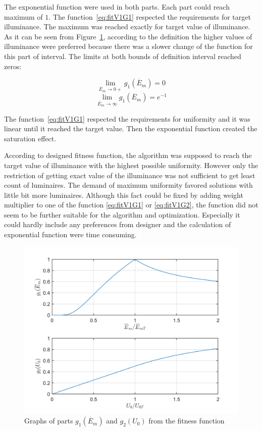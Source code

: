 The exponential function were used in both parts. Each part could reach maximum of $1$. The function~\ref{eq:fitV1G1} respected the requirements for target illuminance. The maximum was reached exactly for target value of illuminance. As it can be seen from Figure~\ref{fig:fitV1G1G2}, according to the definition the higher values of illuminance were preferred because there was a slower change of the function for this part of interval. The limits at both bounds of definition interval reached zeros:

\begin{equation}
\label{eq:g1lim0}
\lim_{\overline{E}_{m}\to 0+} g_1\left(\overline{E}_{m}\right) = 0
\end{equation}
\begin{equation}
\label{eq:g1limInf}
\lim_{\overline{E}_{m}\to \infty} g_1\left(\overline{E}_{m}\right) = e^{-1}
\end{equation}

The function~\ref{eq:fitV1G1} respected the requirements for uniformity and it was linear until it reached the target value. Then the exponential function created the saturation effect.

According to designed fitness function, the algorithm was supposed to reach the target value of illuminance with the highest possible uniformity. However only the restriction of getting exact value of the illuminance was not sufficient to get least count of luminaires. The demand of maximum uniformity favored solutions with little bit more luminaires. Although this fact could be fixed by adding weight multiplier to one of the function \ref{eq:fitV1G1} or \ref{eq:fitV1G2}, the function did not seem to be further suitable for the algorithm and optimization. Especially it could hardly include any preferences from designer and the calculation of exponential function were time consuming.

\begin{figure}[htb]
  \centering
  \includegraphics[width=\columnwidth]{obrG1G2}
  \caption{Graphs of parts $g_1\left(\overline{E}_{m}\right)$ and $g_2\left(U_0\right)$ from the fitness function}
  \label{fig:fitV1G1G2}
\end{figure}

